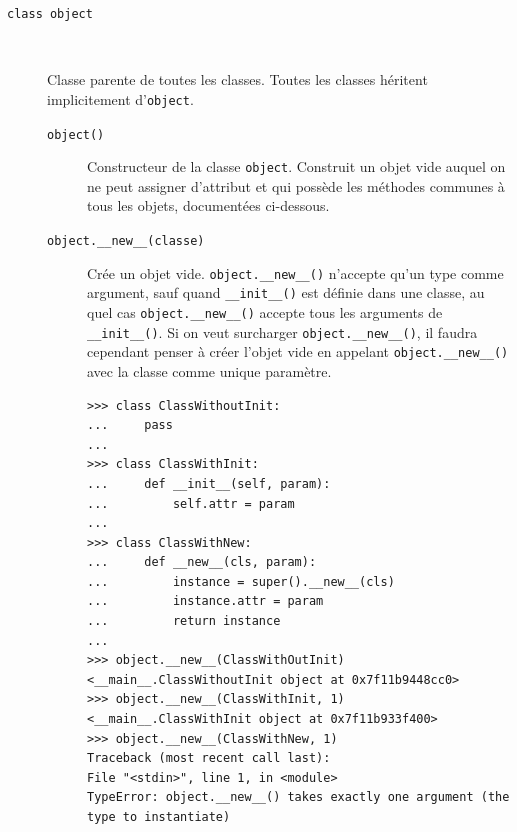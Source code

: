\documentclass[a4paper, 10pt]{article}
\begin{document}
\begin{description}
    \item[\texttt{class object}]~
    
    Classe parente de toutes les classes. Toutes les classes héritent implicitement d'\texttt{object}.
    
    \begin{description}
        \item[\texttt{object()}] Constructeur de la classe \texttt{object}. Construit un objet vide auquel on ne peut assigner d'attribut et qui possède les méthodes communes à tous les objets, documentées ci-dessous.
        \item[\texttt{object.__new__(classe)}] Crée un objet vide. \texttt{object.__new__()} n'accepte qu'un type comme argument, sauf quand \texttt{__init__()} est définie dans une classe, au quel cas \texttt{object.__new__()} accepte tous les arguments de \texttt{__init__()}. Si on veut surcharger \texttt{object.__new__()}, il faudra cependant penser à créer l'objet vide en appelant \texttt{object.__new__()} avec la classe comme unique paramètre.
        
        \begin{verbatim}
>>> class ClassWithoutInit:
...     pass
...
>>> class ClassWithInit:
...     def __init__(self, param):
...         self.attr = param
...
>>> class ClassWithNew:
...     def __new__(cls, param):
...         instance = super().__new__(cls)
...         instance.attr = param
...         return instance
...
>>> object.__new__(ClassWithOutInit)
<__main__.ClassWithoutInit object at 0x7f11b9448cc0>
>>> object.__new__(ClassWithInit, 1)
<__main__.ClassWithInit object at 0x7f11b933f400>
>>> object.__new__(ClassWithNew, 1)
Traceback (most recent call last):
File "<stdin>", line 1, in <module>
TypeError: object.__new__() takes exactly one argument (the type to instantiate)


\end{verbatim}
\end{description}
\end{description}
\end{document}
